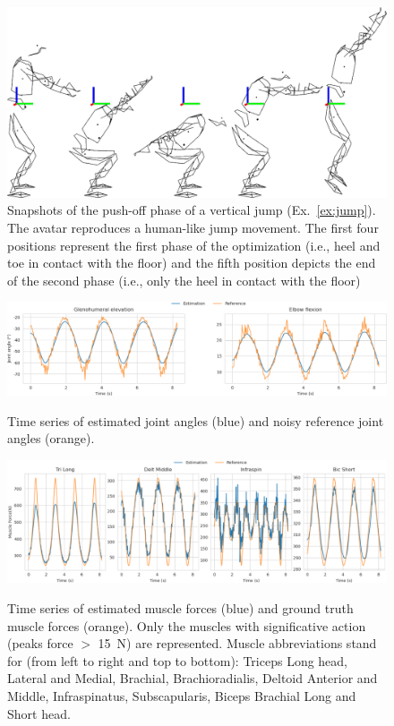 \begin{figure}[t!]
\includegraphics[width=\columnwidth]{figures/kinogramme_jump}
\caption{Snapshots of the push-off phase of a vertical jump (Ex.~\ref{ex:jump}). The avatar reproduces a human-like jump movement. The first four positions represent the first phase of the optimization (i.e., heel and toe in contact with the floor) and the fifth position depicts the end of the second phase (i.e., only the heel in contact with the floor)} 
\label{fig:graph_force_vitesse_longueur}
\end{figure}

\begin{figure}[t!] 
\centering 
\includegraphics[width=\textwidth]{figures/joint_angles_MHE.pdf}\\ 
\caption{Time series of estimated joint angles (blue) and noisy reference joint angles (orange).} 
\label{fig:joint_angles_MHE} 
\end{figure} 

\begin{figure}[t!] 
\centering 
\includegraphics[width=\textwidth]{figures/Muscle_Forces_MHE.pdf}\\ 
\caption{Time series of estimated muscle forces (blue) and ground truth muscle forces (orange). 
Only the muscles with significative action (peaks force $>$ 15~N) are represented.
Muscle abbreviations stand for (from left to right and top to bottom): Triceps Long head, Lateral and Medial, Brachial, Brachioradialis, Deltoid Anterior and Middle, Infraspinatus, Subscapularis, Biceps Brachial Long and Short head.} 
\label{fig:muscle_forces_MHE} 
\end{figure} 
